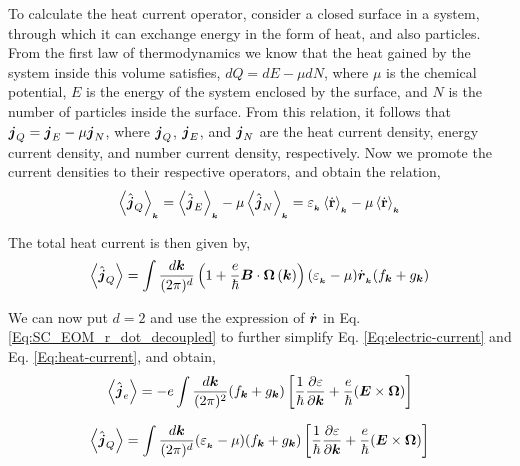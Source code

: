 \documentclass{revtex4-2}
\newcommand{\bvec}[1]{{\mathbf #1}}
\renewcommand\vec[1]{\ensuremath\boldsymbol{#1}} %
\begin{document}
To calculate the heat current operator, consider a closed surface in a system, through which it can exchange energy in the form of heat, and also particles. From the first law of thermodynamics we know that the heat gained by the system inside this volume satisfies, $dQ = dE - \mu dN$, where $\mu$ is the chemical potential, $E$ is the energy of the system enclosed by the surface, and $N$ is the number of particles inside the surface. From this relation, it follows that $\vec{j}_Q = \vec{j}_E - \mu \vec{j}_N$, where $\vec{j}_Q$, $\vec{j}_E$, and $\vec{j}_N$ are the heat current density, energy current density, and number current density, respectively. Now we promote the current densities to their respective operators, and obtain the relation,
\begin{equation} 
	\expval{\hat{\vec{j}}_Q}_{_{\vec{k}}} = \expval{\hat{\vec{j}}_E}_{_{\vec{k}}} - \mu \expval{\hat{\vec{j}}_N}_{_{\vec{k}}} = \varepsilon_{_{\vec{k}}} \expval{\dot{\bvec{r}}}_{_{\vec{k}}} - \mu \expval{\dot{\bvec{r}}}_{_{\vec{k}}}
\end{equation}

The total heat current is then given by,
\begin{equation} \label{Eq:heat-current}
	\expval{\hat{\vec{j}}_Q} = \int \frac{d\vec{k}}{(2\pi)^d} \left(1 + \frac{e}{\hbar} \vec{B} \cdot  \vec{\Omega}\left(\vec{k}\right)\right) (\varepsilon_{_{\vec{k}}} - \mu) \dot{\vec{r}}_{_{\vec{k}}} ({f}_{\vec{k}} + {g}_{\vec{k}})
\end{equation}

We can now put $d = 2$ and use the expression of $\dot{\vec{r}}$ in Eq. \eqref{Eq:SC_EOM_r_dot_decoupled} to further simplify Eq. \eqref{Eq:electric-current} and Eq. \eqref{Eq:heat-current}, and obtain,
\begin{equation} \label{Eq:electric-current-simplified}
	\expval{\hat{\vec{j}}_e} = -e \int \frac{d\vec{k}}{(2\pi)^2} ({f}_{\vec{k}} + {g}_{\vec{k}}) \left[\frac{1}{\hbar} \frac{\partial \varepsilon}{\partial \vec{k}} + \frac{e}{\hbar} (\vec{E}\times\vec{\Omega})\right]
\end{equation}

\begin{equation} \label{Eq:heat-current-simplified}
	\expval{\hat{\vec{j}}_Q} = \int \frac{d\vec{k}}{(2\pi)^d} (\varepsilon_{_{\vec{k}}} - \mu) ({f}_{\vec{k}} + {g}_{\vec{k}}) \left[\frac{1}{\hbar} \frac{\partial \varepsilon}{\partial \vec{k}} + \frac{e}{\hbar} (\vec{E}\times\vec{\Omega})\right]
\end{equation}
\end{document}
